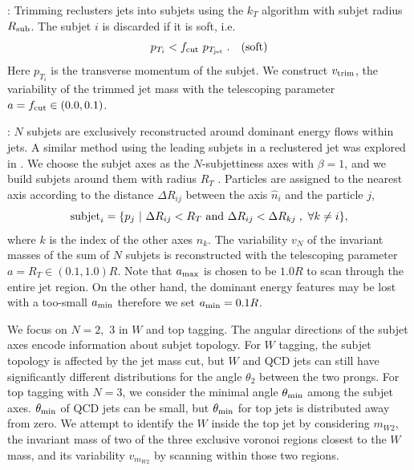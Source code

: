 \documentclass[aps,prl,floatfix,preprintnumbers,twocolumn,groupedaddress,nofootinbib]{revtex4-1}
\newcommand{\be}{\begin{equation}}
\newcommand{\ee}{\end{equation}}
\begin{document}
: Trimming \cite{Krohn:2009th} reclusters jets into subjets using the $k_T$ algorithm with subjet radius $R_{\rm sub}$. The subjet $i$ is discarded if it is soft, i.e. %
\be
    p_{T_i} < f_{\rm cut}~p_{T_{\rm jet}}\;.~~~{\rm (soft)}
\ee
Here $p_{T_i}$ is the transverse momentum of the subjet. We construct $v_{\rm trim}$, the variability of the trimmed jet mass with the telescoping parameter $a = f_{\rm cut} \in (0.0, 0.1)$. %

: $N$ subjets are exclusively reconstructed around %
dominant energy flows within jets. A similar method using the leading subjets in a reclustered jet was explored in \cite{Cui:2010km}. We choose the subjet axes as the $N$-subjettiness axes \cite{Thaler:2010tr} with $\beta = 1$, and we build subjets around them with radius $R_T$ \cite{Stewart:2010tn,Chien:2013kca,Stewart:2015waa,Thaler:2015xaa}. %
Particles are assigned to the nearest axis according to the distance $\Delta R_{ij}$ between the axis $\hat n_i$ and the particle $j$,
\begin{equation}
    {\rm subjet}_{i} = \{p_j~|~\Delta R_{ij}<R_T~{\rm and}~\Delta R_{ij}<\Delta R_{kj}\;,~\forall k\neq i\},
\end{equation}
where $k$ is the index of the other axes $\hat n_k$. The variability $v_N$ of the invariant masses of the sum of $N$ subjets is reconstructed with the telescoping parameter $a = R_{T}\in (0.1, 1.0)R$. Note that $a_{\rm max}$ is chosen to be $1.0R$ to scan through the entire jet region. On the other hand, the dominant energy features may be lost with a too-small $a_{\rm min}$ therefore we set $a_{\rm min}=0.1R$.

We focus on $N = 2,$ 3 in $W$ and top tagging. The angular directions of the subjet axes encode information about subjet topology. For $W$ tagging, the subjet topology is affected by the jet mass cut, but $W$ and QCD jets can still have significantly different distributions for the angle $\theta_2$ between the two prongs. For top tagging with $N=3$, we consider the minimal angle $\theta_{\rm min}$ among the subjet axes. $\theta_{\rm min}$ of QCD jets can be small, but $\theta_{\rm min}$ for top jets is distributed away from zero. We attempt to identify the $W$ inside the top jet \cite{Thaler:2008ju,Kaplan:2008ie} by considering $m_{W2}$, the invariant mass of two of the three exclusive voronoi regions closest to the $W$ mass, and its variability $v_{m_{W2}}$ by scanning within those two regions.
\end{document}
